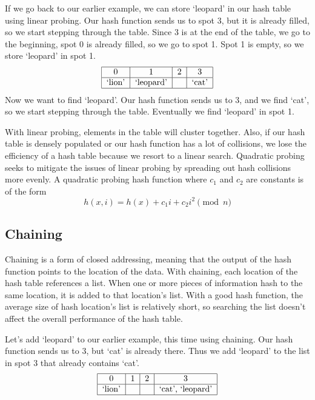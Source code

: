 If we go back to our earlier example, we can store `leopard' in our hash table using linear probing.
Our hash function sends us to spot 3, but it is already filled, so we start stepping through the table.
Since 3 is at the end of the table, we go to the beginning, spot 0 is already filled, so we go to spot 1.
Spot 1 is empty, so we store `leopard' in spot 1.
\[
\begin{tabular}{|c|c|c|c|}
\hline
0 & 1 & 2 & 3\\
\hline
`lion' & `leopard' & & `cat' \\
\hline
\end{tabular}
\]
Now we want to find `leopard'.
Our hash function sends us to 3, and we find `cat', so we start stepping through the table.
Eventually we find `leopard' in spot 1.


With linear probing, elements in the table will cluster together.
Also, if our hash table is densely populated or our hash function has a lot of collisions,
 we lose the efficiency of a hash table because we resort to a linear search.
Quadratic probing seeks to mitigate the issues of linear probing by spreading out hash collisions more evenly.
A quadratic probing hash function where $c_1$ and $c_2$ are constants is of the form
\begin{equation*}
h(x, i) = h(x) + c_1i + c_2i^2 \pmod{n}
\end{equation*}

\subsection*{Chaining}
Chaining is a form of closed addressing, meaning that the output of the hash function points to the location of the data.
With chaining, each location of the hash table references a list.
When one or more pieces of information hash to the same location, it is added to that location's list.
With a good hash function, the average size of hash location's list is relatively short,
so searching the list doesn't affect the overall performance of the hash table.

Let's add `leopard' to our earlier example, this time using chaining.
Our hash function sends us to 3, but `cat' is already there.
Thus we add `leopard' to the list in spot 3 that already contains `cat'.
\[
\begin{tabular}{|c|c|c|c|}
\hline
0 & 1 & 2 & 3\\
\hline
`lion' & & & `cat', `leopard' \\
\hline
\end{tabular}
\]

